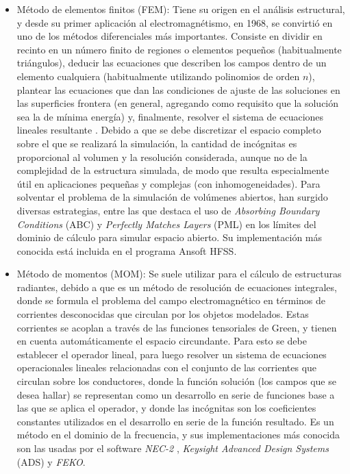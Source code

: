 \begin{itemize}
	\item Método de elementos finitos (FEM): Tiene su origen en el análisis estructural, y desde su primer aplicación al electromagnétismo, en 1968, se convirtió en uno de los métodos diferenciales más importantes. Consiste en dividir en recinto en un número finito de regiones o elementos pequeños (habitualmente triángulos), deducir las ecuaciones que describen los campos dentro de un elemento cualquiera (habitualmente utilizando polinomios de orden $n$), plantear las ecuaciones que dan las condiciones de ajuste de las soluciones en las superficies frontera (en general, agregando como requisito que la solución sea la de mínima energía) y, finalmente, resolver el sistema de ecuaciones lineales resultante \cite{Fernandez:Electromag}. Debido a que se debe discretizar el espacio completo sobre el que se realizará la simulación, la cantidad de incógnitas es proporcional al volumen y la resolución considerada, aunque no de la complejidad de la estructura simulada, de modo que resulta especialmente útil en aplicaciones pequeñas y complejas (con inhomogeneidades). Para solventar el problema de la simulación de volúmenes abiertos, han surgido diversas estrategias, entre las que destaca el uso de \textit{Absorbing Boundary Conditions} (ABC) y \textit{Perfectly Matches Layers} (PML) en los límites del dominio de cálculo para simular espacio abierto. Su implementación más conocida está incluida en el programa Ansoft HFSS.
	\item Método de momentos (MOM): Se suele utilizar para el cálculo de estructuras radiantes, debido a que es un método de resolución de ecuaciones integrales, donde se formula el problema del campo electromagnético en términos de corrientes desconocidas que circulan por los objetos modelados. Estas corrientes se acoplan a través de las funciones tensoriales de Green, y tienen en cuenta automáticamente el espacio circundante. Para esto se debe establecer el operador lineal, para luego resolver un sistema de ecuaciones operacionales lineales relacionadas con el conjunto de las corrientes que circulan sobre los conductores, donde la función solución (los campos que se desea hallar) se representan como un desarrollo en serie de funciones base a las que se aplica el operador, y donde las incógnitas son los coeficientes constantes utilizados en el desarrollo en serie de la función resultado. Es un método en el dominio de la frecuencia, y sus implementaciones más conocida son las usadas por el software \textit{NEC-2} \cite{Fernandez:Electromag}, \textit{Keysight Advanced Design Systems} (ADS) y \textit{FEKO}.

\end{itemize}
